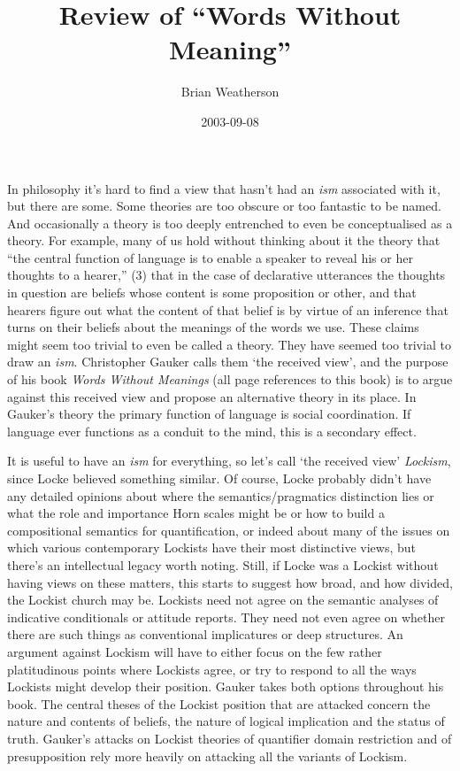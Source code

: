 \documentclass[
  11pt,
  letterpaper,
  DIV=11,
  numbers=noendperiod,
  oneside]{scrartcl}
\title{Review of ``Words Without Meaning''}
\author{Brian Weatherson}
\date{2003-09-08}
\begin{document}
\maketitle
In philosophy it's hard to find a view that hasn't had an \emph{ism}
associated with it, but there are some. Some theories are too obscure or
too fantastic to be named. And occasionally a theory is too deeply
entrenched to even be conceptualised as a theory. For example, many of
us hold without thinking about it the theory that ``the central function
of language is to enable a speaker to reveal his or her thoughts to a
hearer,'' (3) that in the case of declarative utterances the thoughts in
question are beliefs whose content is some proposition or other, and
that hearers figure out what the content of that belief is by virtue of
an inference that turns on their beliefs about the meanings of the words
we use. These claims might seem too trivial to even be called a theory.
They have seemed too trivial to draw an \emph{ism}. Christopher Gauker
calls them `the received view', and the purpose of his book \emph{Words
Without Meanings} (all page references to this book) is to argue against
this received view and propose an alternative theory in its place. In
Gauker's theory the primary function of language is social coordination.
If language ever functions as a conduit to the mind, this is a secondary
effect.

It is useful to have an \emph{ism} for everything, so let's call `the
received view' \emph{Lockism}, since Locke believed something similar.
Of course, Locke probably didn't have any detailed opinions about where
the semantics/pragmatics distinction lies or what the role and
importance Horn scales might be or how to build a compositional
semantics for quantification, or indeed about many of the issues on
which various contemporary Lockists have their most distinctive views,
but there's an intellectual legacy worth noting. Still, if Locke was a
Lockist without having views on these matters, this starts to suggest
how broad, and how divided, the Lockist church may be. Lockists need not
agree on the semantic analyses of indicative conditionals or attitude
reports. They need not even agree on whether there are such things as
conventional implicatures or deep structures. An argument against
Lockism will have to either focus on the few rather platitudinous points
where Lockists agree, or try to respond to all the ways Lockists might
develop their position. Gauker takes both options throughout his book.
The central theses of the Lockist position that are attacked concern the
nature and contents of beliefs, the nature of logical implication and
the status of truth. Gauker's attacks on Lockist theories of quantifier
domain restriction and of presupposition rely more heavily on attacking
all the variants of Lockism.
\end{document}
